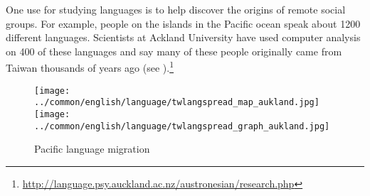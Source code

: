 One use for studying languages is to help discover the origins of remote social groups.
For example, people on the islands in the Pacific ocean speak about {1200} different languages.
       Scientists at Ackland University have used computer analysis on 400 of these languages and say many of these people
       originally came from 
       {Taiwan} thousands of years ago (see ).\footnote{\url{http://language.psy.auckland.ac.nz/austronesian/research.php}}
       \begin{figure}
       \centering
        \texttt{[image: ../common/english/language/twlangspread\_map\_aukland.jpg]}%
        \\\texttt{[image: ../common/english/language/twlangspread\_graph\_aukland.jpg]}%
       \caption{Pacific language migration\label{fig:twlang}}
       \end{figure}

